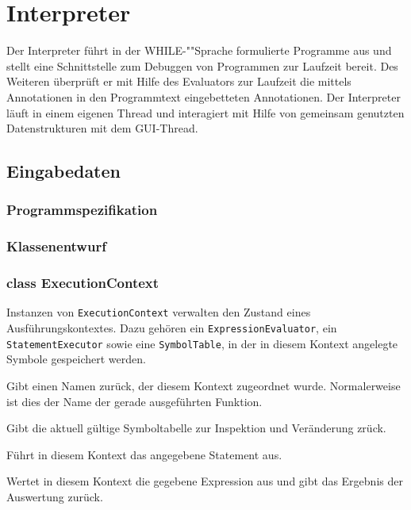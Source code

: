 \section{Interpreter}

Der Interpreter führt in der WHILE-""Sprache formulierte Programme aus und stellt eine Schnittstelle zum Debuggen von Programmen zur Laufzeit bereit. Des Weiteren überprüft er mit Hilfe des Evaluators zur Laufzeit die mittels Annotationen in den Programmtext eingebetteten Annotationen. Der Interpreter läuft in einem eigenen Thread und interagiert mit Hilfe von gemeinsam genutzten Datenstrukturen mit dem GUI-Thread.

\subsection{Eingabedaten}

\subsubsection{Programmspezifikation}


\subsubsection{Klassenentwurf}

\subsubsection{class ExecutionContext}
Instanzen von \texttt{ExecutionContext} verwalten den Zustand eines Ausführungskontextes. Dazu gehören ein \texttt{ExpressionEvaluator}, ein \texttt{StatementExecutor} sowie eine \texttt{SymbolTable}, in der in diesem Kontext angelegte Symbole gespeichert werden.


\begin{description}
    Gibt einen Namen zurück, der diesem Kontext zugeordnet wurde. Normalerweise ist dies der Name der gerade ausgeführten Funktion.

    Gibt die aktuell gültige Symboltabelle zur Inspektion und Veränderung zrück.

    Führt in diesem Kontext das angegebene Statement aus.

    Wertet in diesem Kontext die gegebene Expression aus und gibt das Ergebnis der Auswertung zurück.
\end{description}


